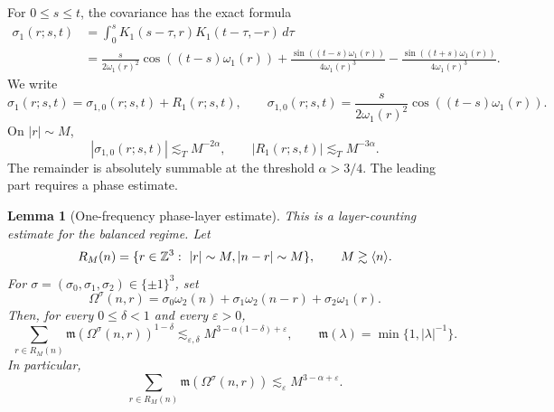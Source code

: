 \documentclass[10pt]{amsart}
\numberwithin{equation}{section}
\theoremstyle{plain}
\newtheorem{lemma}[theorem]{Lemma}
\theoremstyle{definition}
\theoremstyle{remark}
\newcommand{\Z}{\mathbb{Z}}
\newcommand{\eps}{\varepsilon}
\newcommand{\la}{\langle}
\newcommand{\ra}{\rangle}
\newcommand{\frakm}{\mathfrak{m}}
\begin{document}
For \(0\le s\le t\), the covariance has the exact formula
\begin{equation}\label{C:sigma-exact}
\begin{aligned}
        \sigma_1(r;s,t)
        &=\int_0^sK_1(s-\tau,r)K_1(t-\tau,-r)\,d\tau    \\
        &=\frac{s}{2\omega_1(r)^2}\cos((t-s)\omega_1(r))
        +\frac{\sin((t-s)\omega_1(r))}{4\omega_1(r)^3}
        -\frac{\sin((t+s)\omega_1(r))}{4\omega_1(r)^3}.
\end{aligned}
\end{equation}
We write
\begin{equation}\label{C:sigma-split}
        \sigma_1(r;s,t)=\sigma_{1,0}(r;s,t)+R_1(r;s,t),
        \qquad
        \sigma_{1,0}(r;s,t)=\frac{s}{2\omega_1(r)^2}\cos((t-s)\omega_1(r)).
\end{equation}
On \(|r|\sim M\),
\begin{equation}\label{C:sigma-bounds}
        |\sigma_{1,0}(r;s,t)|\lesssim_T M^{-2\alpha},
        \qquad
        |R_1(r;s,t)|\lesssim_T M^{-3\alpha}.
\end{equation}
The remainder is absolutely summable at the threshold \(\alpha>3/4\).  The leading part requires a phase estimate.

\begin{lemma}[One-frequency phase-layer estimate]\label{lem:C-one-frequency-layer}
This is a layer-counting estimate for the balanced regime.
Let
\[
        R_M(n)=\{r\in\Z^3:\ |r|\sim M,\\ |n-r|\sim M\},
        \qquad M\gtrsim\la n\ra.
\]
For \(\sigma=(\sigma_0,\sigma_1,\sigma_2)\in\{\pm1\}^3\), set
\begin{equation}\label{C:Omega-def}
        \Omega^\sigma(n,r)
        =\sigma_0\omega_2(n)+\sigma_1\omega_2(n-r)+\sigma_2\omega_1(r).
\end{equation}
Then, for every \(0\le\delta<1\) and every \(\eps>0\),
\begin{equation}\label{C:Omega-layer-main}
        \sum_{r\in R_M(n)}
        \frakm(\Omega^\sigma(n,r))^{1-\delta}
        \lesssim_{\eps,\delta}
        M^{3-\alpha(1-\delta)+\eps},
        \qquad
        \frakm(\lambda)=\min\{1,|\lambda|^{-1}\}.
\end{equation}
In particular,
\begin{equation}\label{C:Omega-layer-delta0}
        \sum_{r\in R_M(n)}\frakm(\Omega^\sigma(n,r))
        \lesssim_\eps M^{3-\alpha+\eps}.
\end{equation}
\end{lemma}
\end{document}
